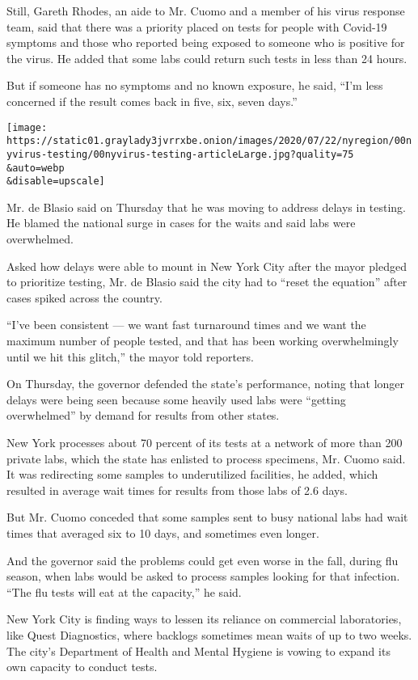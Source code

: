 Still, Gareth Rhodes, an aide to Mr. Cuomo and a member of his virus
response team, said that there was a priority placed on tests for people
with Covid-19 symptoms and those who reported being exposed to someone
who is positive for the virus. He added that some labs could return such
tests in less than 24 hours.

But if someone has no symptoms and no known exposure, he said, ``I'm
less concerned if the result comes back in five, six, seven days.''

\texttt{[image: https://static01.graylady3jvrrxbe.onion/images/2020/07/22/nyregion/00nyvirus-testing/00nyvirus-testing-articleLarge.jpg?quality=75\\\&auto=webp\\\&disable=upscale]}

Mr. de Blasio said on Thursday that he was moving to address delays in
testing. He blamed the national surge in cases for the waits and said
labs were overwhelmed.

Asked how delays were able to mount in New York City after the mayor
pledged to prioritize testing, Mr. de Blasio said the city had to
``reset the equation'' after cases spiked across the country.

``I've been consistent --- we want fast turnaround times and we want the
maximum number of people tested, and that has been working
overwhelmingly until we hit this glitch,'' the mayor told reporters.

On Thursday, the governor defended the state's performance, noting that
longer delays were being seen because some heavily used labs were
``getting overwhelmed'' by demand for results from other states.

New York processes about 70 percent of its tests at a network of more
than 200 private labs, which the state has enlisted to process
specimens, Mr. Cuomo said. It was redirecting some samples to
underutilized facilities, he added, which resulted in average wait times
for results from those labs of 2.6 days.

But Mr. Cuomo conceded that some samples sent to busy national labs had
wait times that averaged six to 10 days, and sometimes even longer.

And the governor said the problems could get even worse in the fall,
during flu season, when labs would be asked to process samples looking
for that infection. ``The flu tests will eat at the capacity,'' he said.

New York City is finding ways to lessen its reliance on commercial
laboratories, like Quest Diagnostics, where backlogs sometimes mean
waits of up to two weeks. The city's Department of Health and Mental
Hygiene is vowing to expand its own capacity to conduct tests.

